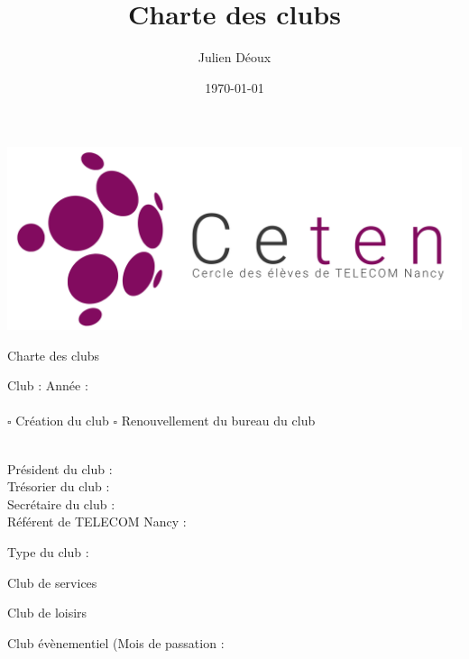 \documentclass{article} %
\title{Charte des clubs}
\author{Julien Déoux}
\date\today
\begin{document}
	
	\begin{titlepage}
		\begin{center}
			\includegraphics[width=\textwidth]{images/ceten.png}\par
			\vspace{0.5cm}
			{\Huge \light Charte des clubs}\par
			\vspace{1cm}
		\end{center}
		\begin{center}
			Club : \underline{\hspace{8cm}}
			Année : \underline{\hspace{1.5cm}}\\
			~\\
			$\square$ Création du club
			\hspace{3cm}
			$\square$ Renouvellement du bureau du club\\
			~\\
			\begin{spacing}{1.5}
				Président du club : \underline{\hspace{7cm}}\\
				Trésorier du club : \underline{\hspace{7cm}}\\
				Secrétaire du club : \underline{\hspace{7cm}}\\
				Référent de TELECOM Nancy : \underline{\hspace{7cm}}\\
			\end{spacing}
		\end{center}
		Type du club :
		\begin{todolist}
		\item Club de services
		\item Club de loisirs
		\item Club évènementiel (Mois de passation :

\end{todolist}
\end{titlepage}
\end{document}
